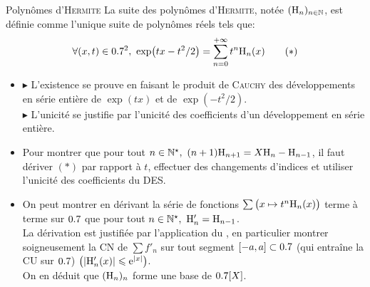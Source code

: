 \begin{defi}{Polynômes d'\textsc{Hermite}}
    La suite des polynômes d'\textsc{Hermite}, notée $(\mathrm{H}_n)_{n \in \mathbb{N}}$, est définie comme l'unique suite de polynômes réels tels que:
    $$\forall(x, t) \in 0.7^2,\ \exp(tx-t^2/2) = \sum_{n=0}^{+\infty} t^n \mathrm{H}_n(x) \qquad (*)$$
\end{defi}

\begin{preuve}
    \begin{itemize}
    \item $\blacktriangleright$ L'existence se prouve en faisant le produit de \textsc{Cauchy} des développements en série entière de $\exp(tx)$ et de $\exp(-t^2/2)$.\\
    $\blacktriangleright$ L'unicité se justifie par l'unicité des coefficients d'un développement en série entière. 
    \item Pour montrer que pour tout $n \in \Ne,\ (n+1)\Hermite_{n+1}=X\Hermite_n-\Hermite_{n-1}$, il faut dériver $(*)$ par rapport à $t$, effectuer des changements d'indices et utiliser l'unicité des coefficients du DES. 
    \item On peut montrer en dérivant  la série de fonctions $\sum \big(x \mapsto t^n \mathrm{H}_n(x) \big)$ terme à terme sur $0.7$ que pour tout $n \in \Ne,\ \Hermite'_n=\Hermite_{n-1}$.\\
    La dérivation est justifiée par l'application du , en particulier montrer soigneusement la CN de $\sum f'_n$ sur tout segment $[-a, a] \subset 0.7$ (qui entraîne la CU sur $0.7$) $\left(|\mathrm{H}'_n(x)| \leqslant \mathrm{e}^{|x|} \right)$.\\
    On en déduit que $(\mathrm{H}_n)_n$ forme une base de $0.7[X]$.\\
    \end{itemize}
\end{preuve}
